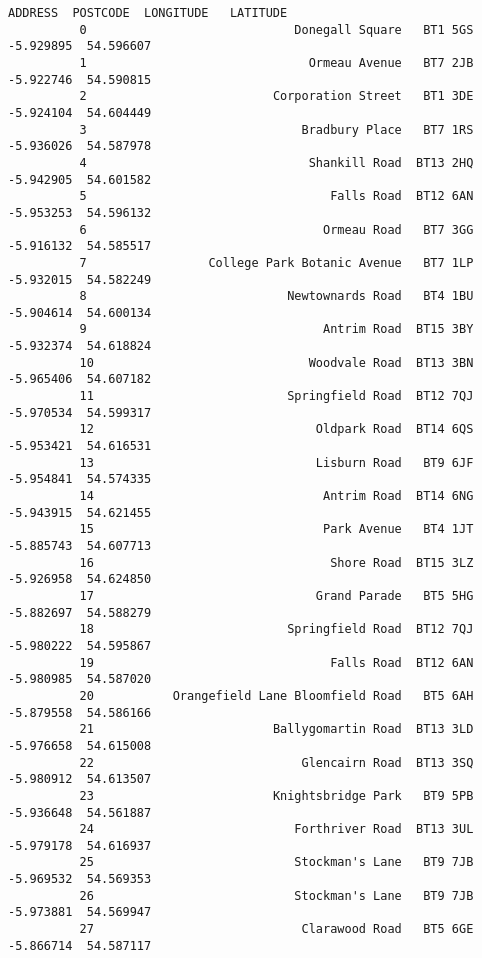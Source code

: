 \documentclass[11pt]{article}
\begin{document}
\begin{Verbatim}[commandchars=\\\{\}]
                                                ADDRESS  POSTCODE  LONGITUDE   LATITUDE  
          0                             Donegall Square   BT1 5GS  -5.929895  54.596607  
          1                               Ormeau Avenue   BT7 2JB  -5.922746  54.590815  
          2                          Corporation Street   BT1 3DE  -5.924104  54.604449  
          3                              Bradbury Place   BT7 1RS  -5.936026  54.587978  
          4                               Shankill Road  BT13 2HQ  -5.942905  54.601582  
          5                                  Falls Road  BT12 6AN  -5.953253  54.596132  
          6                                 Ormeau Road   BT7 3GG  -5.916132  54.585517  
          7                 College Park Botanic Avenue   BT7 1LP  -5.932015  54.582249  
          8                            Newtownards Road   BT4 1BU  -5.904614  54.600134  
          9                                 Antrim Road  BT15 3BY  -5.932374  54.618824  
          10                              Woodvale Road  BT13 3BN  -5.965406  54.607182  
          11                           Springfield Road  BT12 7QJ  -5.970534  54.599317  
          12                               Oldpark Road  BT14 6QS  -5.953421  54.616531  
          13                               Lisburn Road   BT9 6JF  -5.954841  54.574335  
          14                                Antrim Road  BT14 6NG  -5.943915  54.621455  
          15                                Park Avenue   BT4 1JT  -5.885743  54.607713  
          16                                 Shore Road  BT15 3LZ  -5.926958  54.624850  
          17                               Grand Parade   BT5 5HG  -5.882697  54.588279  
          18                           Springfield Road  BT12 7QJ  -5.980222  54.595867  
          19                                 Falls Road  BT12 6AN  -5.980985  54.587020  
          20           Orangefield Lane Bloomfield Road   BT5 6AH  -5.879558  54.586166  
          21                         Ballygomartin Road  BT13 3LD  -5.976658  54.615008  
          22                             Glencairn Road  BT13 3SQ  -5.980912  54.613507  
          23                         Knightsbridge Park   BT9 5PB  -5.936648  54.561887  
          24                            Forthriver Road  BT13 3UL  -5.979178  54.616937  
          25                            Stockman's Lane   BT9 7JB  -5.969532  54.569353  
          26                            Stockman's Lane   BT9 7JB  -5.973881  54.569947  
          27                             Clarawood Road   BT5 6GE  -5.866714  54.587117  

\end{Verbatim}
\end{document}
